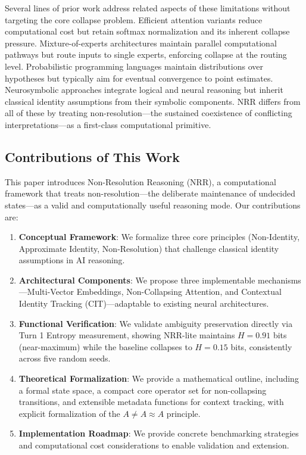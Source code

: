 \documentclass[11pt,a4paper]{article}
\newcommand{\AneqAapproxA}{A \neq A \approx A}
\begin{document}
Several lines of prior work address related aspects of these limitations without targeting the core collapse problem.
Efficient attention variants \cite{child2019generating, dao2022flashattention} reduce computational cost but retain softmax normalization and its inherent collapse pressure.
Mixture-of-experts architectures \cite{shazeer2017outrageously} maintain parallel computational pathways but route inputs to single experts, enforcing collapse at the routing level.
Probabilistic programming languages \cite{goodman2008church} maintain distributions over hypotheses but typically aim for eventual convergence to point estimates.
Neurosymbolic approaches \cite{garcez2020neural} integrate logical and neural reasoning but inherit classical identity assumptions from their symbolic components.
NRR differs from all of these by treating non-resolution---the sustained coexistence of conflicting interpretations---as a first-class computational primitive.

\subsection{Contributions of This Work}

This paper introduces Non-Resolution Reasoning (NRR), a computational framework that treats non-resolution---the deliberate maintenance of undecided states---as a valid and computationally useful reasoning mode.
Our contributions are:

\begin{enumerate}
\item \textbf{Conceptual Framework}: We formalize three core principles (Non-Identity, Approximate Identity, Non-Resolution) that challenge classical identity assumptions in AI reasoning.
\item \textbf{Architectural Components}: We propose three implementable mechanisms---Multi-Vector Embeddings, Non-Collapsing Attention, and Contextual Identity Tracking (CIT)---adaptable to existing neural architectures.
\item \textbf{Functional Verification}: We validate ambiguity preservation directly via Turn 1 Entropy measurement, showing NRR-lite maintains $H = 0.91$ bits (near-maximum) while the baseline collapses to $H = 0.15$ bits, consistently across five random seeds.
\item \textbf{Theoretical Formalization}: We provide a mathematical outline, including a formal state space, a compact core operator set for non-collapsing transitions, and extensible metadata functions for context tracking, with explicit formalization of the $\AneqAapproxA$ principle.
\item \textbf{Implementation Roadmap}: We provide concrete benchmarking strategies and computational cost considerations to enable validation and extension.
\end{enumerate}
\end{document}
